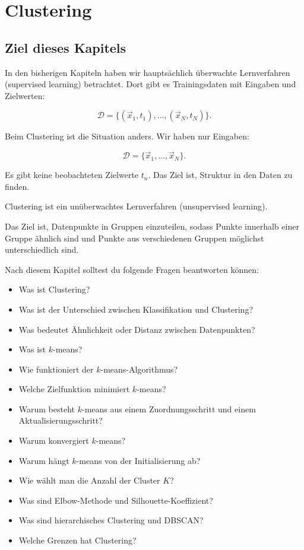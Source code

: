 \chapter{Clustering}

\section{Ziel dieses Kapitels}

In den bisherigen Kapiteln haben wir hauptsächlich überwachte Lernverfahren (supervised learning) betrachtet.
Dort gibt es Trainingsdaten mit Eingaben und Zielwerten:

\[
    \mathcal{D}
    =
    \{(\vec{x}_1,t_1),\dots,(\vec{x}_N,t_N)\}.
\]

Beim Clustering ist die Situation anders.
Wir haben nur Eingaben:

\[
    \mathcal{D}
    =
    \{\vec{x}_1,\dots,\vec{x}_N\}.
\]

Es gibt keine beobachteten Zielwerte \(t_n\).
Das Ziel ist, Struktur in den Daten zu finden.

\begin{conceptbox}
Clustering ist ein unüberwachtes Lernverfahren (unsupervised learning).

Das Ziel ist, Datenpunkte in Gruppen einzuteilen, sodass Punkte innerhalb einer Gruppe ähnlich sind und Punkte aus verschiedenen Gruppen möglichst unterschiedlich sind.
\end{conceptbox}

Nach diesem Kapitel solltest du folgende Fragen beantworten können:

\begin{itemize}
    \item Was ist Clustering?
    \item Was ist der Unterschied zwischen Klassifikation und Clustering?
    \item Was bedeutet Ähnlichkeit oder Distanz zwischen Datenpunkten?
    \item Was ist \(k\)-means?
    \item Wie funktioniert der \(k\)-means-Algorithmus?
    \item Welche Zielfunktion minimiert \(k\)-means?
    \item Warum besteht \(k\)-means aus einem Zuordnungsschritt und einem Aktualisierungsschritt?
    \item Warum konvergiert \(k\)-means?
    \item Warum hängt \(k\)-means von der Initialisierung ab?
    \item Wie wählt man die Anzahl der Cluster \(K\)?
    \item Was sind Elbow-Methode und Silhouette-Koeffizient?
    \item Was sind hierarchisches Clustering und DBSCAN?
    \item Welche Grenzen hat Clustering?
\end{itemize}

